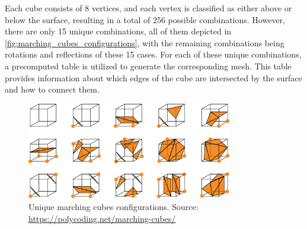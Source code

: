 Each cube consists of 8 vertices, and each vertex is classified as either above or below the surface, resulting in a total of 256 possible combinations.
However, there are only 15 unique combinations, all of them depicted in \autoref{fig:marching_cubes_configurations}, with the remaining combinations being rotations and reflections of these 15 cases.
For each of these unique combinations, a precomputed table is utilized to generate the corresponding mesh.
This table provides information about which edges of the cube are intersected by the surface and how to connect them.

\begin{figure}[h]
    \centering
    \includegraphics[width=0.8\textwidth]{chapters/theoretical_foundations/sections/marching_cubes/resources/marching-cubes-configurations.png}
    \caption[Unique marching cubes configurations]{Unique marching cubes configurations. Source: \url{https://polycoding.net/marching-cubes/}}
    \label{fig:marching_cubes_configurations}
\end{figure}
